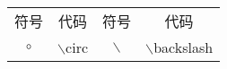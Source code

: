 \documentclass[UTF8,fontset=ubuntu]{ctexart}
\begin{document}
\begin{tabular}{c|c|c|c}
	符号 & 代码 & 符号 & 代码\\
	$\circ$ & $\backslash$circ & $\backslash$ & $\backslash$backslash\\
\end{tabular}
\end{document}
